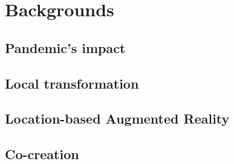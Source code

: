 \chapter{Backgrounds} \label{ch:2}

\section{Pandemic's impact}

\section{Local transformation}

\section{Location-based Augmented Reality}

\section{Co-creation}